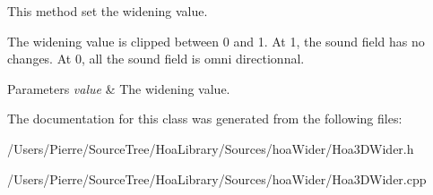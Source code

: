 This method set the widening value. 

The widening value is clipped between 0 and 1. At 1, the sound field has no changes. At 0, all the sound field is omni directionnal.


\begin{DoxyParams}{Parameters}
{\em value} & The widening value. \\
\hline
\end{DoxyParams}


The documentation for this class was generated from the following files\-:\begin{DoxyCompactItemize}
\item 
/\-Users/\-Pierre/\-Source\-Tree/\-Hoa\-Library/\-Sources/hoa\-Wider/Hoa3\-D\-Wider.\-h\item 
/\-Users/\-Pierre/\-Source\-Tree/\-Hoa\-Library/\-Sources/hoa\-Wider/Hoa3\-D\-Wider.\-cpp\end{DoxyCompactItemize}
